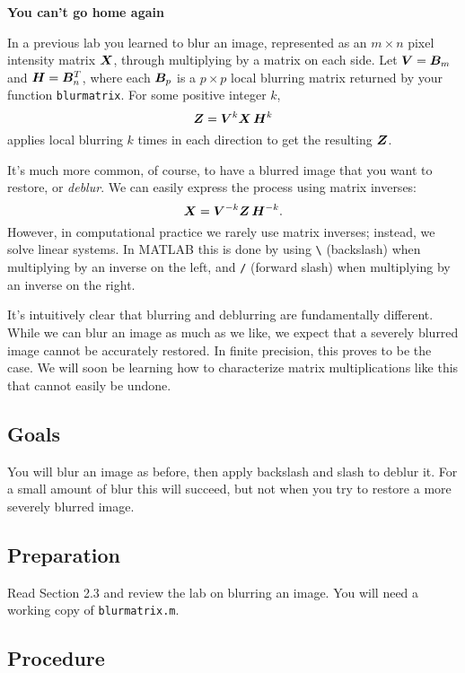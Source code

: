 \documentclass[11pt,twoside]{article}
\begin{document}
\begin{center}
  \bf You can't go home again
\end{center}

In a previous lab you learned to blur an image, represented as an
$m\times n$ pixel intensity matrix $\bm{X}$, through multiplying by a
matrix on each side. Let $\bm{V}=\bm{B}_m$ and $\bm{H}=\bm{B}_n^T$, where each
$\bm{B}_p$ is a $p\times p$ local blurring matrix returned by your function
\texttt{blurmatrix}. For some positive integer $k$, 
\begin{equation}
  \label{eq:BlurDeblur1}
  \bm{Z}=\bm{V}^k \bm{X} \, \bm{H}^k
\end{equation}
applies local blurring $k$ times in each direction to get the
resulting $\bm{Z}$. 

It's much more common, of course, to have a blurred image that you
want to restore, or \textit{deblur}. We can easily express the process
using matrix inverses: 
\[
  \bm{X} = \bm{V}^{-k} \bm{Z} \, \bm{H}^{-k}.
\] 
However, in computational practice we rarely use matrix inverses;
instead, we solve linear systems. In MATLAB this is done by using
\verb+\+ (backslash) when multiplying by an inverse on the left, and
\verb+/+ (forward slash) when multiplying by an inverse on the right.

It's intuitively clear that blurring and deblurring are fundamentally different. While we can blur an image as much as we like, we expect that a severely blurred image cannot be accurately restored. In finite precision, this proves to be the case. We will soon be learning how to characterize matrix multiplications like this that cannot easily be undone. 

\subsection*{Goals}

You will blur an image as before, then apply backslash and slash to
deblur it. For a small amount of blur this will succeed, but not when you try to restore a more severely blurred image. 

\subsection*{Preparation}

Read Section 2.3 and review the lab on blurring an image. You will need a working copy of \texttt{blurmatrix.m}. 

\subsection*{Procedure}
\end{document}

